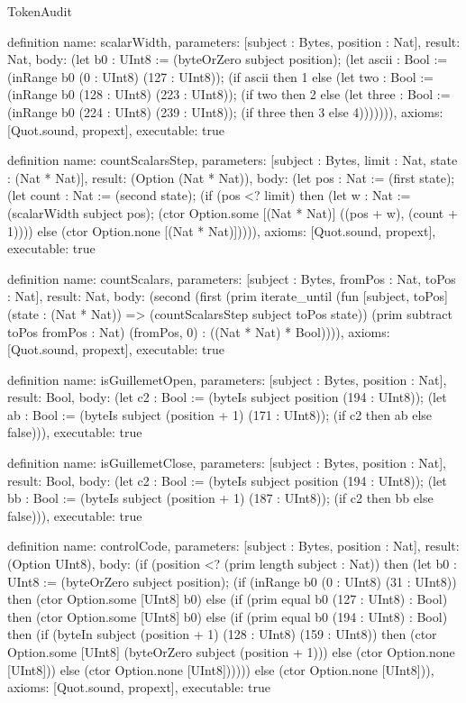 \begin{lexlean}{TokenAudit}
\begin{semanticmodule}
definition{
  name: scalarWidth,
  parameters: [subject : Bytes, position : Nat],
  result: Nat,
  body: (let b0 : UInt8 := (byteOrZero subject position); (let ascii : Bool := (inRange b0 (0 : UInt8) (127 : UInt8)); (if ascii then 1 else (let two : Bool := (inRange b0 (128 : UInt8) (223 : UInt8)); (if two then 2 else (let three : Bool := (inRange b0 (224 : UInt8) (239 : UInt8)); (if three then 3 else 4))))))),
  axioms: [Quot.sound, propext],
  executable: true
}

definition{
  name: countScalarsStep,
  parameters: [subject : Bytes, limit : Nat, state : (Nat * Nat)],
  result: (Option (Nat * Nat)),
  body: (let pos : Nat := (first state); (let count : Nat := (second state); (if (pos <? limit) then (let w : Nat := (scalarWidth subject pos); (ctor Option.some [(Nat * Nat)] ((pos + w), (count + 1)))) else (ctor Option.none [(Nat * Nat)])))),
  axioms: [Quot.sound, propext],
  executable: true
}

definition{
  name: countScalars,
  parameters: [subject : Bytes, fromPos : Nat, toPos : Nat],
  result: Nat,
  body: (second (first (prim iterate_until (fun [subject, toPos] (state : (Nat * Nat)) => (countScalarsStep subject toPos state)) (prim subtract toPos fromPos : Nat) (fromPos, 0) : ((Nat * Nat) * Bool)))),
  axioms: [Quot.sound, propext],
  executable: true
}

definition{
  name: isGuillemetOpen,
  parameters: [subject : Bytes, position : Nat],
  result: Bool,
  body: (let c2 : Bool := (byteIs subject position (194 : UInt8)); (let ab : Bool := (byteIs subject (position + 1) (171 : UInt8)); (if c2 then ab else false))),
  executable: true
}

definition{
  name: isGuillemetClose,
  parameters: [subject : Bytes, position : Nat],
  result: Bool,
  body: (let c2 : Bool := (byteIs subject position (194 : UInt8)); (let bb : Bool := (byteIs subject (position + 1) (187 : UInt8)); (if c2 then bb else false))),
  executable: true
}

definition{
  name: controlCode,
  parameters: [subject : Bytes, position : Nat],
  result: (Option UInt8),
  body: (if (position <? (prim length subject : Nat)) then (let b0 : UInt8 := (byteOrZero subject position); (if (inRange b0 (0 : UInt8) (31 : UInt8)) then (ctor Option.some [UInt8] b0) else (if (prim equal b0 (127 : UInt8) : Bool) then (ctor Option.some [UInt8] b0) else (if (prim equal b0 (194 : UInt8) : Bool) then (if (byteIn subject (position + 1) (128 : UInt8) (159 : UInt8)) then (ctor Option.some [UInt8] (byteOrZero subject (position + 1))) else (ctor Option.none [UInt8])) else (ctor Option.none [UInt8]))))) else (ctor Option.none [UInt8])),
  axioms: [Quot.sound, propext],
  executable: true
}


\end{semanticmodule}
\end{lexlean}
